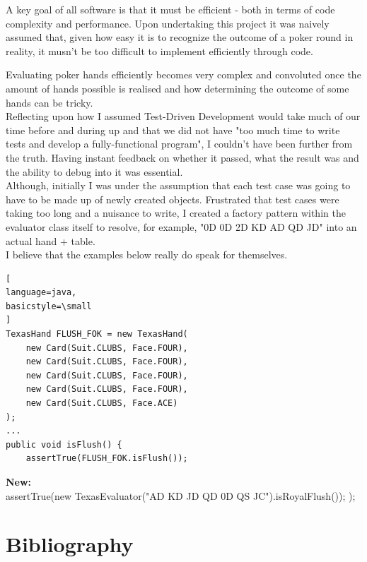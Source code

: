 \documentclass[11pt]{article}
\begin{document}
A key goal of all software is that it must be efficient - both in terms of code complexity and performance. Upon undertaking this project it was naively assumed that, given how easy it is to recognize the outcome of a poker round in reality, it musn't be too difficult to implement efficiently through code. 

Evaluating poker hands efficiently becomes very complex and convoluted once the amount of hands possible is realised and how determining the outcome of some hands can be tricky. \\




Reflecting upon how I assumed Test-Driven Development would take much of our time before and during up and that we did not have "too much time to write tests and develop a fully-functional program", I couldn't have been further from the truth. Having instant feedback on whether it passed, what the result was and the ability to debug into it was essential. \\

Although, initially I was under the assumption that each test case was going to have to be made up of newly created objects. Frustrated that test cases were taking too long and a nuisance to write, I created a factory pattern within the evaluator class itself to resolve, for example, "0D 0D 2D KD AD QD JD" into an actual hand + table.  \\

I believe that the examples below really do speak for themselves. 

\begin{minipage}{.5\textwidth}

\begin{lstlisting}[
language=java,
basicstyle=\small
]
TexasHand FLUSH_FOK = new TexasHand(
    new Card(Suit.CLUBS, Face.FOUR),
    new Card(Suit.CLUBS, Face.FOUR),
    new Card(Suit.CLUBS, Face.FOUR),
    new Card(Suit.CLUBS, Face.FOUR),
    new Card(Suit.CLUBS, Face.ACE)
);
...
public void isFlush() {
    assertTrue(FLUSH_FOK.isFlush());
\end{lstlisting}
\end{minipage}

\textbf{New: } \\
assertTrue(new TexasEvaluator("AD KD JD QD 0D QS JC").isRoyalFlush());
); 







\section*{Bibliography}
\end{document}
